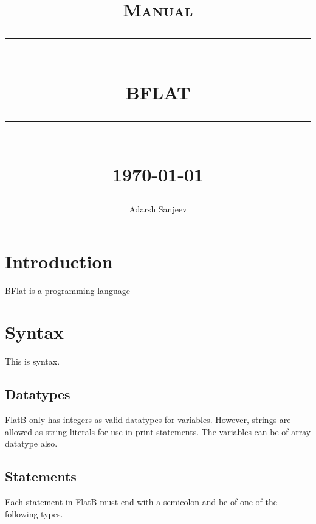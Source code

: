 \documentclass[12pt]{report}
\newcommand{\HRule}[1]{\rule{\linewidth}{#1}}
\begin{document}
\title{ \normalsize \textsc{Manual}
		\\ [2.0cm]
		\HRule{0.5pt} \\
		\LARGE \textbf{\uppercase{BFlat}}
		\HRule{2pt} \\ [0.5cm]
		\normalsize \today \vspace*{5\baselineskip}}

\date{}

\author{ Adarsh Sanjeev }

\maketitle
\tableofcontents
\newpage

\sectionfont{\scshape}


\section*{Introduction}
BFlat is a programming language

\section*{Syntax}

This is syntax.

\subsection*{Datatypes}

FlatB only has integers as valid datatypes for variables. However, strings are allowed as string literals for use in print statements.
The variables can be of array datatype also.

\subsection*{Statements}
Each statement in FlatB must end with a semicolon and be of one of the following types.
\end{document}
